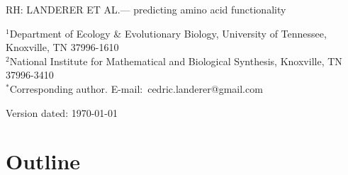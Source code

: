 \documentclass[12pt]{article}
\begin{document}
\doublespacing
\linenumbers



\noindent RH: LANDERER ET AL.--- predicting amino acid functionality
\bigskip
\medskip
\begin{center}

\bigskip


\begin{abstract}
\end{abstract}	




\end{center}

\vfill

{\small
\noindent$^{1}$Department of Ecology \& Evolutionary Biology, University of Tennessee, Knoxville, TN 37996-1610\\
\noindent$^{2}$National Institute for Mathematical and Biological Synthesis, Knoxville, TN 37996-3410\\
\noindent$^{*}$Corresponding author. E-mail:~cedric.landerer@gmail.com
}

\vfill
\centerline{Version dated: \today}
\vfill
\newpage
\section*{Outline}
\end{document}
